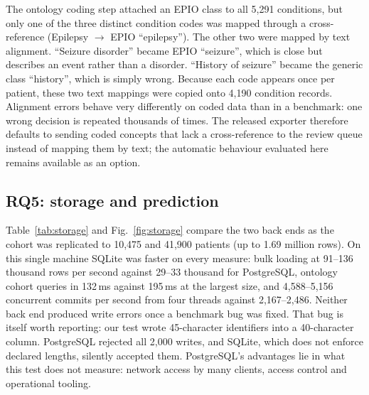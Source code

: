 \documentclass[preprint,12pt]{elsarticle}
\begin{document}
\begin{table}[t]
\centering
\caption{Agreement between EpiFHIR and Synthea's own FHIR export. Medication and procedure times compared as UTC instants; condition onsets as calendar dates.}
\label{tab:conc}
\footnotesize
{}
\end{table}

The ontology coding step attached an EPIO class to all 5,291 conditions, but only one of the three distinct condition codes was mapped through a cross-reference (Epilepsy $\rightarrow$ EPIO ``epilepsy''). The other two were mapped by text alignment. ``Seizure disorder'' became EPIO ``seizure'', which is close but describes an event rather than a disorder. ``History of seizure'' became the generic class ``history'', which is simply wrong. Because each code appears once per patient, these two text mappings were copied onto 4,190 condition records. Alignment errors behave very differently on coded data than in a benchmark: one wrong decision is repeated thousands of times. The released exporter therefore defaults to sending coded concepts that lack a cross-reference to the review queue instead of mapping them by text; the automatic behaviour evaluated here remains available as an option.

\subsection{RQ5: storage and prediction}
Table~\ref{tab:storage} and Fig.~\ref{fig:storage} compare the two back ends as the cohort was replicated to 10,475 and 41,900 patients (up to 1.69 million rows). On this single machine SQLite was faster on every measure: bulk loading at 91--136 thousand rows per second against 29--33 thousand for PostgreSQL, ontology cohort queries in 132\,ms against 195\,ms at the largest size, and 4,588--5,156 concurrent commits per second from four threads against 2,167--2,486. Neither back end produced write errors once a benchmark bug was fixed. That bug is itself worth reporting: our test wrote 45-character identifiers into a 40-character column. PostgreSQL rejected all 2,000 writes, and SQLite, which does not enforce declared lengths, silently accepted them. PostgreSQL's advantages lie in what this test does not measure: network access by many clients, access control and operational tooling.
\end{document}
